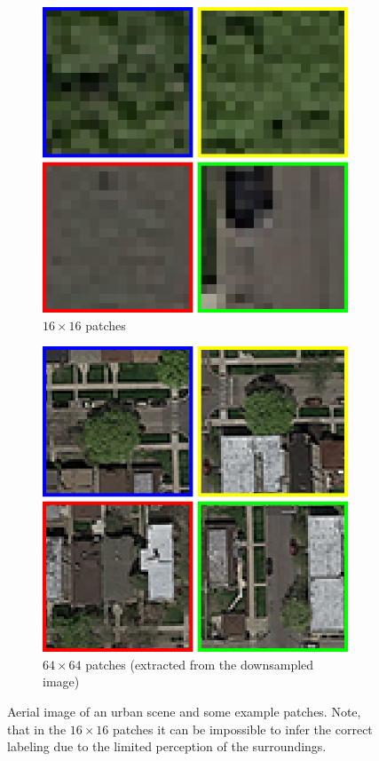 \documentclass[10pt,conference,compsocconf]{IEEEtran}
\begin{document}
\begin{figure}
\begin{subfigure}[t]{.15\textwidth}
		\includegraphics[width=1\textwidth]{figs/context_size/context16}
		\caption{$ 16 \times 16 $ patches}
	\end{subfigure}
	\begin{subfigure}[t]{.15\textwidth}
		\includegraphics[width=1\textwidth]{figs/context_size/context64_ds}
		\caption{$ 64 \times 64 $ patches (extracted from the downsampled image)}
	\end{subfigure}
	\caption{Aerial image of an urban scene and some example patches. Note, that in the $ 16 \times 16 $ patches it can be impossible to infer the correct labeling due to the limited perception of the surroundings.}
	\label{fig:context_size}
\end{figure}
\end{document}
